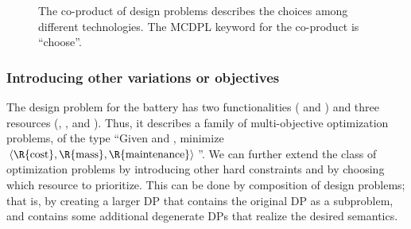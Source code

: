 \begin{figure}[h]

\smallskip{}

\caption{\label{fig:batteriesbig}The co-product of design problems describes
the choices among different technologies. The MCDPL keyword for the
co-product is ``choose''.}
\end{figure}


\subsubsection{Introducing other variations or objectives}

The design problem for the battery has two functionalities (
and ) and three resources (, ,
and ). Thus, it describes a family of multi-objective
optimization problems, of the type ``Given  and ,
minimize $\left\langle \R{\text{cost}},\R{\text{mass}},\R{\text{maintenance}}\right\rangle $''.
We can further extend the class of optimization problems by introducing
other hard constraints and by choosing which resource to prioritize.
This can be done by composition of design problems; that is, by creating
a larger DP that contains the original DP as a subproblem, and contains
some additional degenerate DPs that realize the desired semantics.

